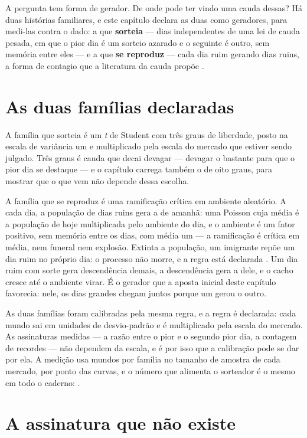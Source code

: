 A pergunta tem forma de gerador. De onde pode ter vindo uma cauda dessas? Há duas histórias
familiares, e este capítulo declara as duas como geradores, para medi-las contra o dado:
a que \textbf{sorteia} --- dias independentes de uma lei de cauda pesada, em que o pior dia é um
sorteio azarado e o seguinte é outro, sem memória entre eles --- e a que \textbf{se reproduz} ---
cada dia ruim gerando dias ruins, a forma de contagio que a literatura da cauda propõe
\cite{dong2020critical}.

\section{As duas famílias declaradas}

A família que sorteia é um \emph{t} de Student com três graus de liberdade, posto na escala de
variância um e multiplicado pela escala do mercado que estiver sendo julgado. Três graus é cauda
que decai devagar --- devagar o bastante para que o pior dia se destaque --- e o capítulo carrega
também o de oito graus, para mostrar que o que vem não depende dessa escolha.

A família que se reproduz é uma ramificação crítica em ambiente aleatório. A cada dia, a população
de dias ruins gera a de amanhã: uma Poisson cuja média é a população de hoje multiplicada pelo
ambiente do dia, e o ambiente é um fator positivo, sem memória entre os dias, com média um --- a
ramificação é crítica em média, nem funeral nem explosão. Extinta a população, um imigrante repõe
um dia ruim no próprio dia: o processo não morre, e a regra está declarada
\cite{dong2020critical}. Um dia ruim com sorte gera descendência demais, a descendência gera a
dele, e o cacho cresce até o ambiente virar. É o gerador que a aposta inicial deste capítulo
favorecia: nele, os dias grandes chegam juntos porque um gerou o outro.

As duas famílias foram calibradas pela mesma regra, e a regra é declarada: cada mundo sai em
unidades de desvio-padrão e é multiplicado pela escala do mercado. As assinaturas medidas --- a
razão entre o pior e o segundo pior dia, a contagem de recordes --- não dependem da escala, e é
por isso que a calibração pode se dar por ela. A medição usa \numCaudaMundos{} mundos por família
no tamanho de amostra de cada mercado, \numCaudaMundosCurva{} por ponto das curvas, e o número que
alimenta o sorteador é o mesmo em todo o caderno: \numCaudaSemente{}.

\section{A assinatura que não existe}

